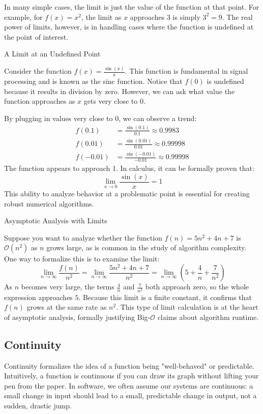 In many simple cases, the limit is just the value of the function at that point. For example, for \( f(x) = x^2 \), the limit as \( x \) approaches 3 is simply \( 3^2 = 9 \). The real power of limits, however, is in handling cases where the function is undefined at the point of interest.

\begin{example} A Limit at an Undefined Point

Consider the function \( f(x) = \frac{\sin(x)}{x} \). This function is fundamental in signal processing and is known as the sinc function. Notice that \( f(0) \) is undefined because it results in division by zero. However, we can ask what value the function approaches as \( x \) gets very close to 0.

By plugging in values very close to 0, we can observe a trend:
\begin{align*}
f(0.1) &= \frac{\sin(0.1)}{0.1} \approx 0.9983 \\
f(0.01) &= \frac{\sin(0.01)}{0.01} \approx 0.99998 \\
f(-0.01) &= \frac{\sin(-0.01)}{-0.01} \approx 0.99998
\end{align*}
The function appears to approach 1. In calculus, it can be formally proven that:
\[
\lim_{x \to 0} \frac{\sin(x)}{x} = 1
\]
This ability to analyze behavior at a problematic point is essential for creating robust numerical algorithms.
\end{example}

\begin{example} Asymptotic Analysis with Limits

Suppose you want to analyze whether the function \( f(n) = 5n^2 + 4n + 7 \) is \( \mathcal{O}(n^2) \) as \( n \) grows large, as is common in the study of algorithm complexity. One way to formalize this is to examine the limit:
\[
\lim_{n \to \infty} \frac{f(n)}{n^2}
= \lim_{n \to \infty} \frac{5n^2 + 4n + 7}{n^2}
= \lim_{n \to \infty} \left( 5 + \frac{4}{n} + \frac{7}{n^2} \right)
\]
As \( n \) becomes very large, the terms \( \frac{4}{n} \) and \( \frac{7}{n^2} \) both approach zero, so the whole expression approaches \( 5 \). Because this limit is a finite constant, it confirms that \( f(n) \) grows at the same rate as \( n^2 \). This type of limit calculation is at the heart of asymptotic analysis, formally justifying Big-\(\mathcal{O}\) claims about algorithm runtime.
\end{example}

\subsection*{Continuity}
Continuity formalizes the idea of a function being "well-behaved" or predictable. Intuitively, a function is continuous if you can draw its graph without lifting your pen from the paper. In software, we often assume our systems are continuous: a small change in input should lead to a small, predictable change in output, not a sudden, drastic jump.

